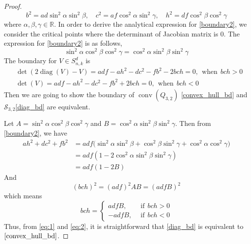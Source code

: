 \documentclass[11pt]{amsart}
\newcommand{\Szero}[2]{\ensuremath{\mathcal{S}_{#1,#2}}}
\theoremstyle{plain}
\theoremstyle{definition}
\theoremstyle{remark}
\newcommand{\RR}{\mathbb{R}}
\DeclareMathOperator{\conv}{conv}
\DeclareMathOperator{\diag}{diag}
\begin{document}
\begin{appendices}
\begin{proof}
\begin{equation}
				b^2 = ad\sin^2\alpha\sin^2\beta,\quad c^2 = af\cos^2\alpha\sin^2\gamma,\quad h^2 = df\cos^2\beta \cos^2\gamma
			\end{equation}
			where $\alpha,\beta,\gamma \in \RR$. In order to derive the analytical expression for \eqref{boundary2}, we consider the critical points where the determinant of Jacobian matrix is 0. The expression for \eqref{boundary2} is as follows,
			\begin{equation}\label{convex_hull_bd}
				\sin^2\alpha\cos^2\beta\cos^2\gamma = \cos^2\alpha\sin^2\beta\sin^2\gamma
			\end{equation}
			The boundary for $V\in S^d_{n,k}$ is 
			\begin{equation}\label{diag_bd}
				\begin{split}
					&\det(2\diag(V) - V) = adf - ah^2 - dc^2 - fb^2 - 2bch = 0,~~\text{when}~~ bch>0 \\
					&\det(V) =  adf - ah^2 - dc^2 - fb^2 + 2bch = 0,~~\text{when}~~ bch<0 
				\end{split}
			\end{equation}
			Then we are going to show the boundary of $\conv(Q_{3,2})$ \eqref{convex_hull_bd} and $\Szero{3}{2}$\eqref{diag_bd} are equivalent.
			
			Let $A = \sin^2\alpha\cos^2\beta\cos^2\gamma$ and $B = \cos^2\alpha\sin^2\beta\sin^2\gamma$. Then from \eqref{boundary2}, we have 
			\begin{equation}\label{eq:1}
				\begin{split}
					ah^2 + dc^2 + fb^2 &= adf\big(\sin^2\alpha\sin^2\beta + \cos^2\beta\sin^2\gamma + \cos^2 \alpha \cos^2\gamma\big)\\
					&= adf(1-2\cos^2\alpha\sin^2\beta\sin^2\gamma)\\
					& = adf(1-2B)
				\end{split}
			\end{equation}
			And
			\begin{equation}
				(bch)^2 = (adf)^2 AB =  (adfB)^2 
			\end{equation}
			which means 
			\begin{equation}\label{eq:2}
				bch = 
				\begin{cases}
					adfB, &~~\text{if}~~bch>0\\
					-adfB, &~~\text{if}~~ bch<0
				\end{cases}
			\end{equation}
			Thus, from \eqref{eq:1} and \eqref{eq:2}, it is straightforward that \eqref{diag_bd} is equivalent to $\eqref{convex_hull_bd}$.
		\end{proof}
		

\end{appendices}
\end{document}
